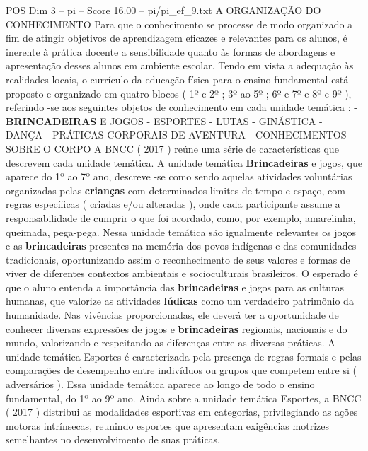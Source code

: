 \begin{textsample}{POS Dim 3 – pi – Score 16.00 – pi/pi\_ef\_9.txt}  \label{ex:f3_pos_254}
A ORGANIZAÇÃO DO CONHECIMENTO Para que o conhecimento se processe de modo organizado a fim de atingir objetivos de aprendizagem eficazes e relevantes para os alunos, é inerente à prática docente a sensibilidade quanto às formas de abordagens e apresentação desses alunos em ambiente escolar.
Tendo em vista a adequação às realidades locais, o currículo da educação física para o ensino fundamental está proposto e organizado em quatro blocos ( 1º e 2º ; 3º ao 5º ; 6º e 7º e 8º e 9º ), referindo -se aos seguintes objetos de conhecimento em cada unidade temática : - \textbf{BRINCADEIRAS} E JOGOS - ESPORTES - LUTAS - GINÁSTICA - DANÇA - PRÁTICAS CORPORAIS DE AVENTURA - CONHECIMENTOS SOBRE O CORPO A BNCC ( 2017 ) reúne uma série de características que descrevem cada unidade temática.
A unidade temática \textbf{Brincadeiras} e jogos, que aparece do 1º ao 7º ano, descreve -se como sendo aquelas atividades voluntárias organizadas pelas \textbf{crianças} com determinados limites de tempo e espaço, com regras específicas ( criadas e/ou alteradas ), onde cada participante assume a responsabilidade de cumprir o que foi acordado, como, por exemplo, amarelinha, queimada, pega-pega.
Nessa unidade temática são igualmente relevantes os jogos e as \textbf{brincadeiras} presentes na memória dos povos indígenas e das comunidades tradicionais, oportunizando assim o reconhecimento de seus valores e formas de viver de diferentes contextos ambientais e socioculturais brasileiros.
O esperado é que o aluno entenda a importância das \textbf{brincadeiras} e jogos para as culturas humanas, que valorize as atividades \textbf{lúdicas} como um verdadeiro patrimônio da humanidade.
Nas vivências proporcionadas, ele deverá ter a oportunidade de conhecer diversas expressões de jogos e \textbf{brincadeiras} regionais, nacionais e do mundo, valorizando e respeitando as diferenças entre as diversas práticas.
A unidade temática Esportes é caracterizada pela presença de regras formais e pelas comparações de desempenho entre indivíduos ou grupos que competem entre si ( adversários ).
Essa unidade temática aparece ao longo de todo o ensino fundamental, do 1º ao 9º ano.
Ainda sobre a unidade temática Esportes, a BNCC ( 2017 ) distribui as modalidades esportivas em categorias, privilegiando as ações motoras intrínsecas, reunindo esportes que apresentam exigências motrizes semelhantes no desenvolvimento de suas práticas.

\end{textsample}
